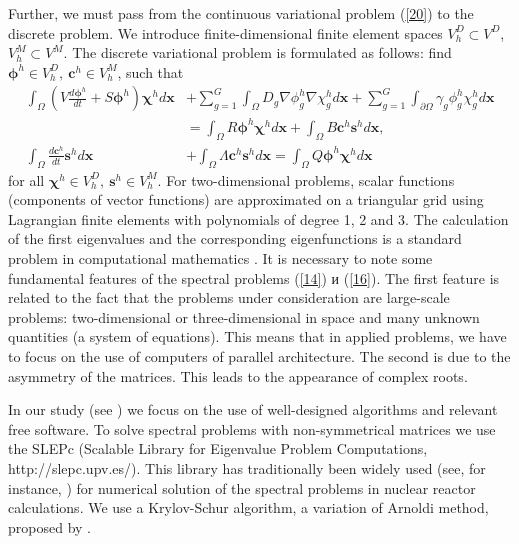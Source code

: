 \documentclass[authoryear]{elsarticle}
\begin{document}
Further, we must pass from the continuous variational problem  (\ref{20}) to the discrete problem. We introduce finite-dimensional finite element spaces  $V_h^D \subset V^D$, $V_h^M \subset V^M$.
The discrete variational problem is formulated as follows: find  $\bm \phi^h \in V_h^D, \ \bm c^h \in V_h^M$, such that
\begin{equation}\label{21}
\begin{split}
 \int_\Omega \left (V \frac{d \bm\phi^h}{d t} + S\bm \phi^h \right )\bm \chi^h  d\bm x 
 & + \sum_{g=1}^{G} \int_\Omega D_g\nabla \phi_g^h \nabla \chi_g^h  d\bm x 
 + \sum_{g=1}^{G} \int_{\partial \Omega} \gamma_g \phi_g^h \chi_g^h  d\bm x \\
 & = \int_\Omega R \bm \phi^h \bm \chi^h d\bm x + \int_\Omega B\bm c^h \bm s^h d\bm x, \\
 \int_\Omega \frac{d \bm{c}^h}{d t} \bm s^h d\bm x 
 &+ \int_\Omega \Lambda \bm{c}^h \bm s^h d\bm x = \int_\Omega Q \bm{\phi}^h \bm \chi^h d\bm x
\end{split}
\end{equation}
for all $\bm \chi^h  \in V_h^D, \ \bm s^h \in V_h^M$.
For two-dimensional problems, scalar functions (components of vector functions) are approximated on a triangular grid using Lagrangian finite elements with polynomials of degree 1, 2 and 3. The calculation of the first eigenvalues and the corresponding eigenfunctions is a standard problem in computational mathematics \citep{Saadbook}.
It is necessary to note some fundamental features of the spectral problems (\ref{14}) и (\ref{16}).
The first feature is related to the fact that the problems under consideration are large-scale problems: two-dimensional or three-dimensional in space and many unknown quantities (a system of equations). This means that in applied problems, we have to focus on the use of computers of parallel architecture. The second is due to the asymmetry of the matrices. This leads to the appearance of complex roots.

In our study  (see \cite{avvakumov2017spectral,nd-mm}) we focus on the use of well-designed algorithms and relevant free software. To solve spectral problems with non-symmetrical matrices we use the SLEPc 
(Scalable Library for Eigenvalue Problem Computations, http://slepc.upv.es/). 
This library has traditionally been widely used (see, for instance,  \cite{hernandez2003resolution,hernandez2005slepc})
for numerical solution of the spectral problems in nuclear reactor calculations. We use a Krylov-Schur algorithm, a variation of Arnoldi method, proposed by \citep{stewart2002krylov}. 
\end{document}

